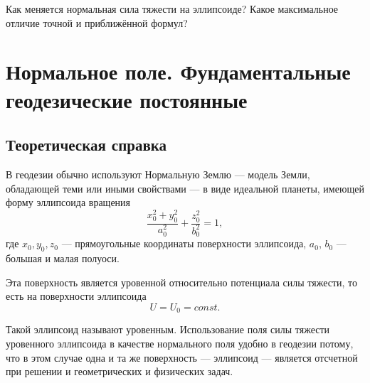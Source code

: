 \documentclass[11pt, a4paper,addpoints]{exam}
\theoremstyle{remark}
\begin{document}
\begin{questions}
    Как меняется нормальная сила тяжести на эллипсоиде? Какое максимальное отличие точной и
    приближённой формул?
\end{questions}

\newpage
    
\section*{\centering Нормальное поле. Фундаментальные геодезические постоянные}
\subsection*{\centering Теоретическая справка}

В геодезии обычно используют Нормальную Землю --- модель Земли, обладающей теми или иными свойствами
--- в виде идеальной планеты, имеющей форму эллипсоида вращения
\begin{equation*}
    \dfrac{x_0^2 + y_0^2}{a_0^2} + \dfrac{z_0^2}{b_0^2} = 1,
\end{equation*}
где $x_0, y_0, z_0$ --- прямоугольные координаты поверхности эллипсоида, $a_0$, $b_0$ --- большая и
малая полуоси.

Эта поверхность является уровенной относительно потенциала силы тяжести, то есть на поверхности
эллипсоида
\begin{equation*}
    U = U_0 = const.
\end{equation*}

Такой эллипсоид называют уровенным. Использование поля силы
тяжести уровенного эллипсоида в качестве нормального поля удобно
в геодезии потому, что в этом случае одна и та же поверхность --- 
эллипсоид --- является отсчетной при решении и 
геометрических и физических задач.
\end{document}

